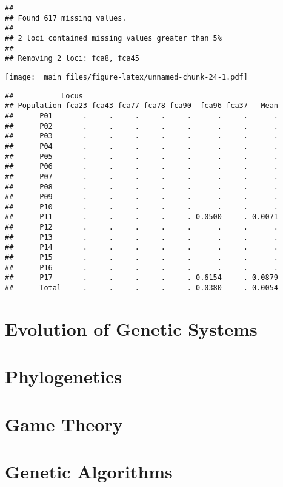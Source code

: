 \documentclass[12pt,]{krantz}
\theoremstyle{definition}
\theoremstyle{definition}
\theoremstyle{definition}
\theoremstyle{remark}
\begin{document}
\begin{verbatim}
## 
## Found 617 missing values.
## 
## 2 loci contained missing values greater than 5%
## 
## Removing 2 loci: fca8, fca45
\end{verbatim}

\texttt{[image: \_main\_files/figure-latex/unnamed-chunk-24-1.pdf]}

\begin{verbatim}
##           Locus
## Population fca23 fca43 fca77 fca78 fca90  fca96 fca37   Mean
##      P01       .     .     .     .     .      .     .      .
##      P02       .     .     .     .     .      .     .      .
##      P03       .     .     .     .     .      .     .      .
##      P04       .     .     .     .     .      .     .      .
##      P05       .     .     .     .     .      .     .      .
##      P06       .     .     .     .     .      .     .      .
##      P07       .     .     .     .     .      .     .      .
##      P08       .     .     .     .     .      .     .      .
##      P09       .     .     .     .     .      .     .      .
##      P10       .     .     .     .     .      .     .      .
##      P11       .     .     .     .     . 0.0500     . 0.0071
##      P12       .     .     .     .     .      .     .      .
##      P13       .     .     .     .     .      .     .      .
##      P14       .     .     .     .     .      .     .      .
##      P15       .     .     .     .     .      .     .      .
##      P16       .     .     .     .     .      .     .      .
##      P17       .     .     .     .     . 0.6154     . 0.0879
##      Total     .     .     .     .     . 0.0380     . 0.0054
\end{verbatim}

\section{Evolution of Genetic
Systems}\label{evolution-of-genetic-systems}

\section{Phylogenetics}\label{phylogenetics}

\section{Game Theory}\label{game-theory}

\section{Genetic Algorithms}\label{genetic-algorithms}
\end{document}
